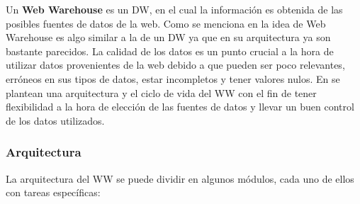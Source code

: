 \documentclass[a4paper,11pt]{article}
\begin{document}
    Un \textbf{Web Warehouse} es un DW, en el cual la información es obtenida de las posibles fuentes de datos de la web. Como se menciona en \cite{webwarehouse}
    la idea de Web Warehouse es algo similar a la de un DW ya que en su arquitectura ya son bastante parecidos. La calidad de los datos es un punto crucial a la
    hora de utilizar datos provenientes de la web debido a que pueden ser poco relevantes, erróneos en sus tipos de datos, estar incompletos y tener valores
    nulos. En \cite{webwarehouse} se plantean una arquitectura y el ciclo de vida del WW con el fin de tener flexibilidad a la hora de elección de las fuentes de
    datos y llevar un buen control de los datos utilizados.
    
    
    \subsubsection{Arquitectura}
    
    La arquitectura del WW se puede dividir en algunos módulos, cada uno de ellos con tareas específicas:
    
\end{document}
